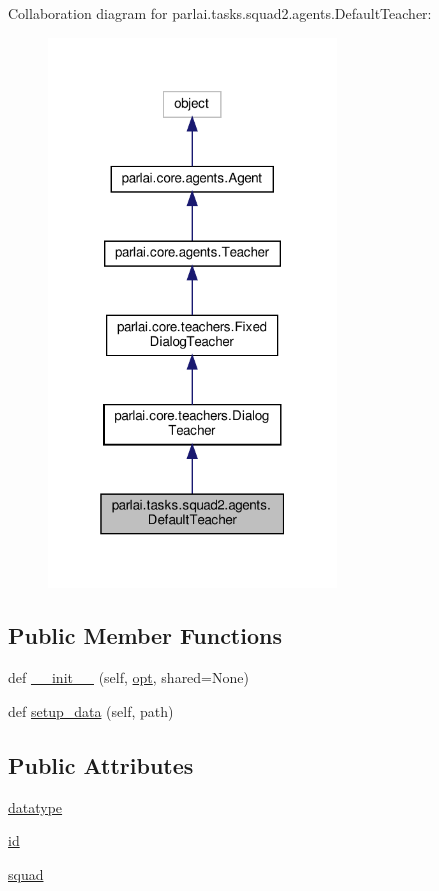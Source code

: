 Collaboration diagram for parlai.\+tasks.\+squad2.\+agents.\+Default\+Teacher\+:
\nopagebreak
\begin{figure}[H]
\begin{center}
\leavevmode
\includegraphics[width=217pt]{classparlai_1_1tasks_1_1squad2_1_1agents_1_1DefaultTeacher__coll__graph}
\end{center}
\end{figure}
\subsection*{Public Member Functions}
\begin{DoxyCompactItemize}
\item 
def \hyperlink{classparlai_1_1tasks_1_1squad2_1_1agents_1_1DefaultTeacher_aa97ab84de16c6d73501fef0c11bb1608}{\+\_\+\+\_\+init\+\_\+\+\_\+} (self, \hyperlink{classparlai_1_1core_1_1agents_1_1Teacher_a3ce6243860ce978a897922863ed32fa4}{opt}, shared=None)
\item 
def \hyperlink{classparlai_1_1tasks_1_1squad2_1_1agents_1_1DefaultTeacher_a68185506bbbcaadaee2dbf5162483437}{setup\+\_\+data} (self, path)
\end{DoxyCompactItemize}
\subsection*{Public Attributes}
\begin{DoxyCompactItemize}
\item 
\hyperlink{classparlai_1_1tasks_1_1squad2_1_1agents_1_1DefaultTeacher_a94222f3b61455346a81469cb340906a1}{datatype}
\item 
\hyperlink{classparlai_1_1tasks_1_1squad2_1_1agents_1_1DefaultTeacher_ac4998f160789f2d35c7ddc9c8b24792e}{id}
\item 
\hyperlink{classparlai_1_1tasks_1_1squad2_1_1agents_1_1DefaultTeacher_a69f44b45bdcb0f11323c45781c4b20a2}{squad}
\end{DoxyCompactItemize}
